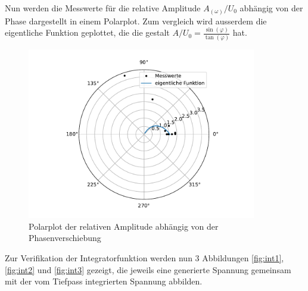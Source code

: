 Nun werden die Messwerte für die relative Amplitude $A_{(\omega)}/U_0$ abhängig von der Phase dargestellt in einem Polarplot.
Zum vergleich wird ausserdem die eigentliche Funktion geplottet, die die gestalt $A/U_0 = \frac{\sin(\varphi)}{\tan(\varphi)}$ hat.

\begin{figure}
\centering
\includegraphics[width = 10cm]{plot4.pdf}
\caption{Polarplot der relativen Amplitude abhängig von der Phasenverschiebung}
\label{fig:plot4}
\end{figure}

Zur Verifikation der Integratorfunktion werden nun 3 Abbildungen \ref{fig:int1},  \ref{fig:int2} und \ref{fig:int3} gezeigt, die jeweils eine generierte Spannung gemeinsam mit der vom Tiefpass integrierten Spannung abbilden.

